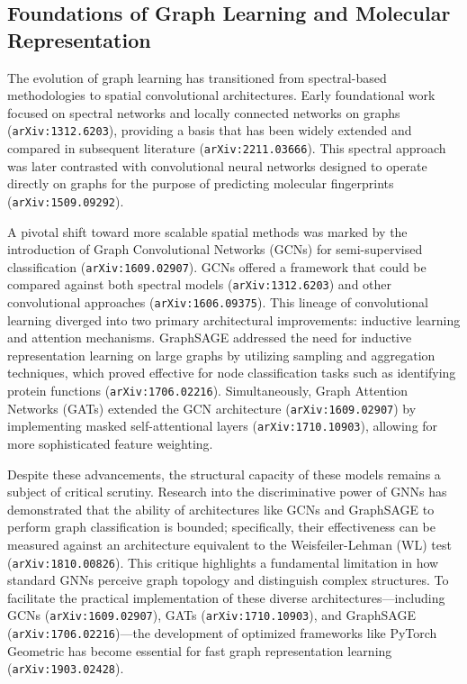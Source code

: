 \documentclass[11pt]{article}
\begin{document}
\subsection{Foundations of Graph Learning and Molecular Representation}

The evolution of graph learning has transitioned from spectral-based methodologies to spatial convolutional architectures. Early foundational work focused on spectral networks and locally connected networks on graphs (\texttt{arXiv:1312.6203}), providing a basis that has been widely extended and compared in subsequent literature (\texttt{arXiv:2211.03666}). This spectral approach was later contrasted with convolutional neural networks designed to operate directly on graphs for the purpose of predicting molecular fingerprints (\texttt{arXiv:1509.09292}).

A pivotal shift toward more scalable spatial methods was marked by the introduction of Graph Convolutional Networks (GCNs) for semi-supervised classification (\texttt{arXiv:1609.02907}). GCNs offered a framework that could be compared against both spectral models (\texttt{arXiv:1312.6203}) and other convolutional approaches (\texttt{arXiv:1606.09375}). This lineage of convolutional learning diverged into two primary architectural improvements: inductive learning and attention mechanisms. GraphSAGE addressed the need for inductive representation learning on large graphs by utilizing sampling and aggregation techniques, which proved effective for node classification tasks such as identifying protein functions (\texttt{arXiv:1706.02216}). Simultaneously, Graph Attention Networks (GATs) extended the GCN architecture (\texttt{arXiv:1609.02907}) by implementing masked self-attentional layers (\texttt{arXiv:1710.10903}), allowing for more sophisticated feature weighting.

Despite these advancements, the structural capacity of these models remains a subject of critical scrutiny. Research into the discriminative power of GNNs has demonstrated that the ability of architectures like GCNs and GraphSAGE to perform graph classification is bounded; specifically, their effectiveness can be measured against an architecture equivalent to the Weisfeiler-Lehman (WL) test (\texttt{arXiv:1810.00826}). This critique highlights a fundamental limitation in how standard GNNs perceive graph topology and distinguish complex structures. To facilitate the practical implementation of these diverse architectures—including GCNs (\texttt{arXiv:1609.02907}), GATs (\texttt{arXiv:1710.10903}), and GraphSAGE (\texttt{arXiv:1706.02216})—the development of optimized frameworks like PyTorch Geometric has become essential for fast graph representation learning (\texttt{arXiv:1903.02428}).
\end{document}

